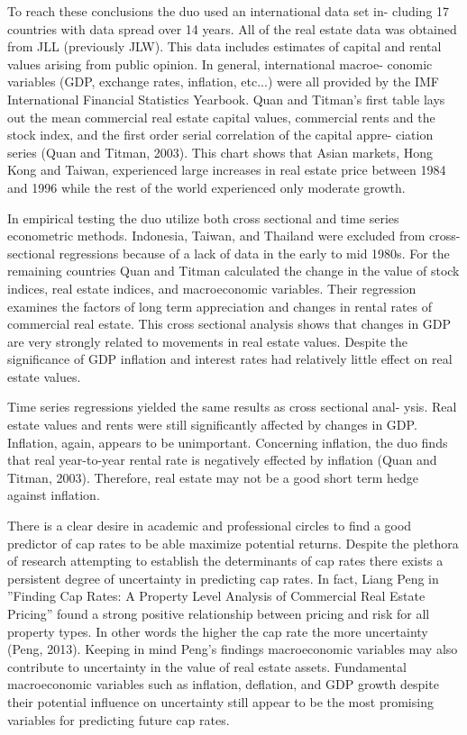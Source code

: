 To reach these conclusions the duo used an international data set in- cluding 17 countries with data spread over 14 years. All of the real estate data was obtained from JLL (previously JLW). This data includes estimates of capital and rental values arising from public opinion. In general, international macroe- conomic variables (GDP, exchange rates, inflation, etc...) were all provided by the IMF International Financial Statistics Yearbook.  Quan and Titman’s first table lays out the mean commercial real estate capital values, commercial rents and the stock index, and the first order serial correlation of the capital appre- ciation series (Quan and Titman, 2003). This chart shows that Asian markets, Hong Kong and Taiwan, experienced large increases in real estate price between 1984 and 1996 while the rest of the world experienced only moderate growth.

In empirical testing the duo utilize both cross sectional and time series econometric methods. Indonesia, Taiwan, and Thailand were excluded from cross-sectional regressions because of a lack of data in the early to mid 1980s. For the remaining countries Quan and Titman  calculated  the  change  in  the value of stock indices, real estate indices, and macroeconomic variables. Their regression examines the factors of long term appreciation and changes in rental rates of commercial real estate.  This cross sectional analysis shows that changes in GDP are very strongly related to movements in real estate values. Despite the significance of GDP inflation and interest rates had relatively little effect on real estate values.

Time series regressions yielded the same results as cross sectional anal- ysis. Real estate values and rents were still significantly affected by changes in GDP. Inflation, again, appears to be unimportant.  Concerning inflation, the duo finds that real year-to-year rental rate is negatively effected by inflation (Quan and Titman, 2003). Therefore, real estate may not be a good short term hedge against inflation.

There is a clear desire in academic and professional circles to find a good predictor of cap rates to be able maximize potential returns. Despite the plethora of research attempting to establish the determinants of cap rates there exists a persistent degree of uncertainty in predicting cap rates. In fact, Liang Peng in ”Finding Cap Rates: A Property Level Analysis of Commercial Real Estate Pricing” found a strong positive relationship between pricing and risk for all property types. In other words the higher the cap rate the more uncertainty (Peng, 2013). Keeping in mind Peng’s findings macroeconomic variables may also contribute to uncertainty in the value of real estate assets. Fundamental macroeconomic variables such as inflation, deflation, and GDP growth despite their potential influence on uncertainty still appear to be the most promising variables for predicting future cap rates.

